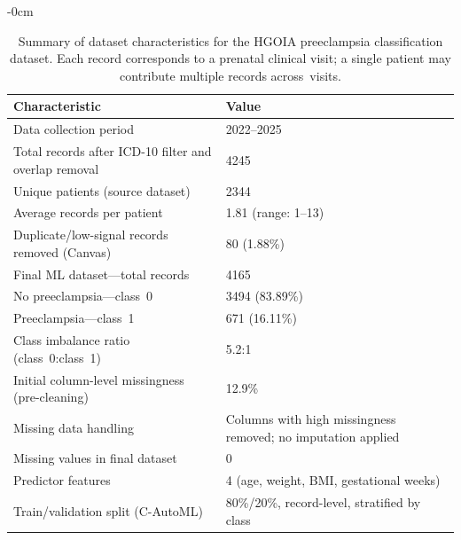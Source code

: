 \documentclass[diagnostics,article,accept,pdftex,moreauthors]{Definitions/mdpi}
\begin{document}
\begin{table}[H]
  \small
  \centering
  \caption{Summary of dataset characteristics for the
    \ac{HGOIA} preeclampsia classification dataset. Each record corresponds
    to a prenatal clinical visit; a single patient may contribute multiple
    records across\mbox{ visits.}\label{tab:dataset-characteristics}}
  \begin{adjustwidth}{-\extralength}{0cm}
  \begin{tabularx}{\linewidth}{Ll}
    \toprule
    \textbf{Characteristic} & \textbf{Value} \\
    \midrule
    Data collection period & 2022--2025 \\
    Total records after ICD-10 filter and overlap removal & {4245} \\
    Unique patients (source dataset) & {2344} \\
    Average records per patient & 1.81 (range: 1--13) \\
    Duplicate/low-signal records removed (Canvas) & 80 (1.88\%) \\
    \midrule
    {Final {ML} dataset---total records} %
 & {4165} \\
    No preeclampsia---class~0 & {3494} (83.89\%) \\
    Preeclampsia---class~1 & 671 (16.11\%) \\
    Class imbalance ratio (class~0:class~1) & 5.2:1 \\
    \midrule
    Initial column-level missingness (pre-cleaning) & 12.9\% \\
    Missing data handling & Columns with high missingness removed; no imputation applied \\
    Missing values in final dataset & 0 \\
    \midrule
    Predictor features & 4 ({age, weight, {BMI}, gestational
                         weeks}) %
 \\
    Train/validation split (\ac{C-AutoML}) & 80\%/20\%, record-level, stratified by class \\
    \bottomrule
  \end{tabularx}
  \end{adjustwidth}
\end{table}
\end{document}

